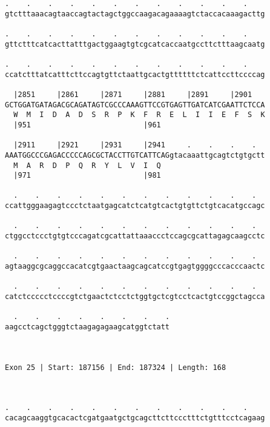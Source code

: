 \documentclass{article}
\begin{document}
\begin{Verbatim}
.    .    .    .    .    .    .    .    .    .    .    .    
gtctttaaacagtaaccagtactagctggccaagacagaaaagtctaccacaaagacttg
                                                            
.    .    .    .    .    .    .    .    .    .    .    .    
gttctttcatcacttatttgactggaagtgtcgcatcaccaatgccttctttaagcaatg
                                                            
.    .    .    .    .    .    .    .    .    .    .    .    
ccatctttatcatttcttccagtgttctaattgcactgttttttctcattccttccccag
                                                            
  |2851     |2861     |2871     |2881     |2891     |2901   
GCTGGATGATAGACGCAGATAGTCGCCCAAAGTTCCGTGAGTTGATCATCGAATTCTCCA
  W  M  I  D  A  D  S  R  P  K  F  R  E  L  I  I  E  F  S  K
  |951                          |961                        
  
  |2911     |2921     |2931     |2941     .    .    .    .  
AAATGGCCCGAGACCCCCAGCGCTACCTTGTCATTCAGgtacaaattgcagtctgtgctt
  M  A  R  D  P  Q  R  Y  L  V  I  Q                        
  |971                          |981                        
  
  .    .    .    .    .    .    .    .    .    .    .    .  
ccattgggaagagtccctctaatgagcatctcatgtcactgtgttctgtcacatgccagc
                                                            
  .    .    .    .    .    .    .    .    .    .    .    .  
ctggcctccctgtgtcccagatcgcattattaaaccctccagcgcattagagcaagcctc
                                                            
  .    .    .    .    .    .    .    .    .    .    .    .  
agtaaggcgcaggccacatcgtgaactaagcagcatccgtgagtggggcccacccaactc
                                                            
  .    .    .    .    .    .    .    .    .    .    .    .  
catctccccctccccgtctgaactctcctctggtgctcgtcctcactgtccggctagcca
                                                            
  .    .    .    .    .    .    .    .
aagcctcagctgggtctaagagagaagcatggtctatt
                                      
                                      
 
Exon 25 | Start: 187156 | End: 187324 | Length: 168



.    .    .    .    .    .    .    .    .    .    .    .    
cacagcaaggtgcacactcgatgaatgctgcagcttcttccctttctgtttcctcagaag
                                                            

\end{Verbatim}
\end{document}
